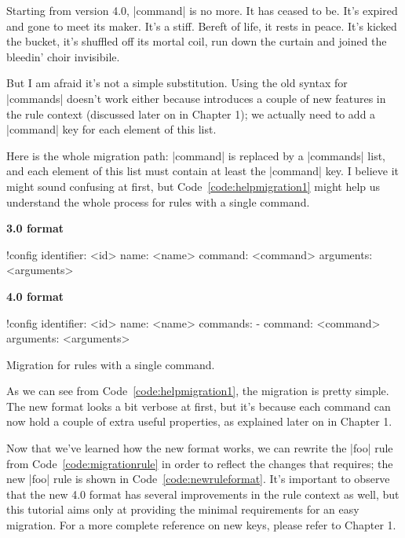 \documentclass[a4paper,twoside,12pt]{memoir}
\begin{document}
\begin{remark}[frametitle={Your friendly duck says}]
Starting from version 4.0, |command| is no more. It has ceased to be. It's expired and gone to meet its maker. It's a stiff. Bereft of life, it rests in peace. It's kicked the bucket, it's shuffled off its mortal coil, run down the curtain and joined the bleedin' choir invisibile.
\end{remark}

But I am afraid it's not a simple substitution. Using the old syntax for |commands| doesn't work either because  introduces a couple of new features in the rule context (discussed later on in Chapter 1); we actually need to add a |command| key for each element of this list.

Here is the whole migration path: |command| is replaced by a |commands| list, and each element of this list must contain at least the |command| key. I believe it might sound confusing at first, but Code~\ref{code:helpmigration1} might help us understand the whole process for rules with a single command.

\begin{code}[htbp]
\begin{minipage}[t]{0.5\textwidth}
{\sffamily\bfseries\color{araracolour} 3.0 format}
\begin{codelisting}
!config
identifier: <id>
name: <name>
command: <command>
arguments: <arguments>
\end{codelisting}
\end{minipage}%
\begin{minipage}[t]{0.5\textwidth}
{\sffamily\bfseries\color{araracolour} 4.0 format}
\begin{codelisting}
!config
identifier: <id>
name: <name>
commands:
- command: <command>
arguments: <arguments>
\end{codelisting}
\end{minipage}
\caption{Migration for rules with a single command.}
\label{code:helpmigration1}
\end{code}

As we can see from Code~\ref{code:helpmigration1}, the migration is pretty simple. The new format looks a bit verbose at first, but it's because each command can now hold a couple of extra useful properties, as explained later on in Chapter 1.

Now that we've learned how the new format works, we can rewrite the |foo| rule from Code~\ref{code:migrationrule} in order to reflect the changes that  requires; the new |foo| rule is shown in Code~\ref{code:newruleformat}. It's important to observe that the new 4.0 format has several improvements in the rule context as well, but this tutorial aims only at providing the minimal requirements for an easy migration. For a more complete reference on new keys, please refer to Chapter 1.
\end{document}
